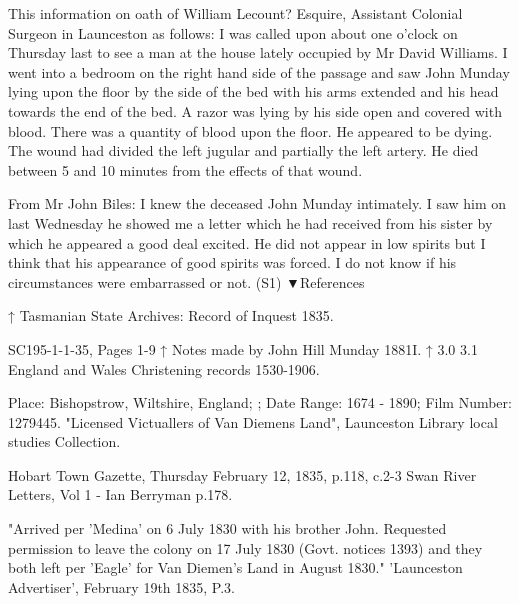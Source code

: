 This information on oath of William Lecount? Esquire, Assistant Colonial Surgeon in Launceston as follows: I was called upon about one o'clock on Thursday last to see a man at the house lately occupied by Mr David Williams. I went into a bedroom on the right hand side of the passage and saw John Munday lying upon the floor by the side of the bed with his arms extended and his head towards the end of the bed. A razor was lying by his side open and covered with blood. There was a quantity of blood upon the floor. He appeared to be dying. The wound had divided the left jugular and partially the left artery. He died between 5 and 10 minutes from the effects of that wound.

From Mr John Biles: I knew the deceased John Munday intimately. I saw him on last Wednesday he showed me a letter which he had received from his sister by which he appeared a good deal excited. He did not appear in low spirits but I think that his appearance of good spirits was forced. I do not know if his circumstances were embarrassed or not. (S1)
▼References

    ↑ Tasmanian State Archives: Record of Inquest 1835.

    SC195-1-1-35, Pages 1-9
    ↑ Notes made by John Hill Munday 1881I.
    ↑ 3.0 3.1 England and Wales Christening records 1530-1906.

    Place: Bishopstrow, Wiltshire, England; ; Date Range: 1674 - 1890; Film Number: 1279445.
      "Licensed Victuallers of Van Diemens Land", Launceston Library local studies Collection.

    Hobart Town Gazette, Thursday February 12, 1835, p.118, c.2-3
      Swan River Letters, Vol 1 - Ian Berryman p.178.

    "Arrived per 'Medina' on 6 July 1830 with his brother John. Requested permission to leave the colony on 17 July 1830 (Govt. notices 1393) and they both left per 'Eagle' for Van Diemen's Land in August 1830."
      'Launceston Advertiser', February 19th 1835, P.3.

